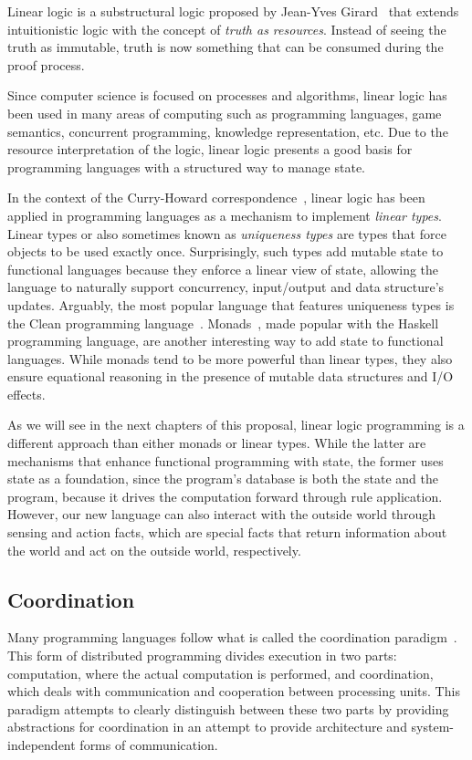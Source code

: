 Linear logic is a substructural logic proposed by Jean-Yves Girard~\cite{Girard95logic:its} that extends intuitionistic logic with the concept of \emph{truth as resources}. Instead of seeing the truth as immutable, truth is now something that can be consumed during the proof process.

Since computer science is focused on processes and algorithms, linear logic has been used
in many areas of computing such as programming languages, game semantics, concurrent programming, knowledge representation, etc.
Due to the resource interpretation of the logic, linear logic presents a good basis for programming
languages with a structured way to manage state.

In the context of the Curry-Howard correspondence~\cite{howard:tfatnoc}, linear logic has been applied in programming languages
as a mechanism to implement \emph{linear types}. Linear types or also sometimes known as \emph{uniqueness types} are types
that force objects to be used exactly once. Surprisingly, such types add mutable state to functional languages because they enforce
a linear view of state, allowing the language to naturally support concurrency, input/output and data structure's updates.
Arguably, the most popular language that features uniqueness types is the Clean programming language~\cite{JFP:1349748}.
Monads~\cite{Wadler:1997:DI:262009.262011}, made popular with the Haskell programming language, are another interesting way to add state
to functional languages. While monads tend to be more powerful than linear types, they also ensure equational reasoning in the presence
of mutable data structures and I/O effects.

As we will see in the next chapters of this proposal, linear logic programming is a different approach than either monads or linear types.
While the latter are mechanisms that enhance functional programming with state, the former uses state as a foundation, since
the program's database is both the state and the program, because it drives the computation forward through rule application. However, our
new language can also interact with the outside world through sensing and action facts, which are special facts that return information
about the world and act on the outside world, respectively.

\subsection{Coordination}

Many programming languages follow what is called the coordination paradigm~\cite{Papadopoulos98coordinationmodels}. This form of distributed
programming divides execution in two parts: computation, where the actual computation is performed, and
coordination, which deals with communication and cooperation between processing units. This paradigm attempts to clearly distinguish between
these two parts by providing abstractions for coordination in an attempt to provide architecture and system-independent forms of communication.

